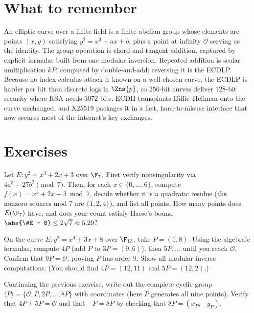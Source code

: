 \section*{What to remember}

An elliptic curve over a finite field is a finite abelian group whose elements are
points $(x,y)$ satisfying $y^2 = x^3 + ax + b$, plus a point at infinity $\mathcal{O}$
serving as the identity. The group operation is chord-and-tangent addition, captured by
explicit formulas built from one modular inversion. Repeated addition is scalar
multiplication $kP$, computed by double-and-add; reversing it is the ECDLP. Because no
index-calculus attack is known on a well-chosen curve, the ECDLP is harder per bit than
discrete logs in $\Zns{p}$, so $256$-bit curves deliver $128$-bit security where RSA
needs $3072$ bits. ECDH transplants Diffie--Hellman onto the curve unchanged, and
X25519 packages it in a fast, hard-to-misuse interface that now secures most of the
internet's key exchanges.

\section{Exercises}
\label{ch21:exercises}

\begin{exercise}
\label{ch21:ex-count}
Let $E: y^2 = x^3 + 2x + 3$ over $\F_7$. First verify nonsingularity via
$4a^3 + 27b^2 \pmod 7$. Then, for each $x \in \{0,\dots,6\}$, compute $f(x)=x^3+2x+3
\bmod 7$, decide whether it is a quadratic residue (the nonzero squares mod $7$ are
$\{1,2,4\}$), and list all points. How many points does $E(\F_7)$ have, and does your
count satisfy Hasse's bound $\abs{\#E - 8} \le 2\sqrt 7 \approx 5.29$?
\end{exercise}

\begin{exercise}
\label{ch21:ex-add}
On the curve $E: y^2 = x^3 + 3x + 8$ over $\F_{13}$, take $P=(1,8)$. Using the algebraic
formulas, compute $4P$ (add $P$ to $3P=(9,6)$), then $5P,\dots$ until you reach
$\mathcal{O}$. Confirm that $9P = \mathcal{O}$, proving $P$ has order $9$. Show all
modular-inverse computations. (You should find $4P=(12,11)$ and $5P=(12,2)$.)
\end{exercise}

\begin{exercise}
\label{ch21:ex-subgroup}
Continuing the previous exercise, write out the complete cyclic group
$\langle P\rangle = \{\mathcal{O}, P, 2P, \dots, 8P\}$ with coordinates (here $P$
generates all nine points). Verify that $4P + 5P = \mathcal{O}$ and that $-P = 8P$ by
checking that $8P = (x_P, -y_P)$.
\end{exercise}

